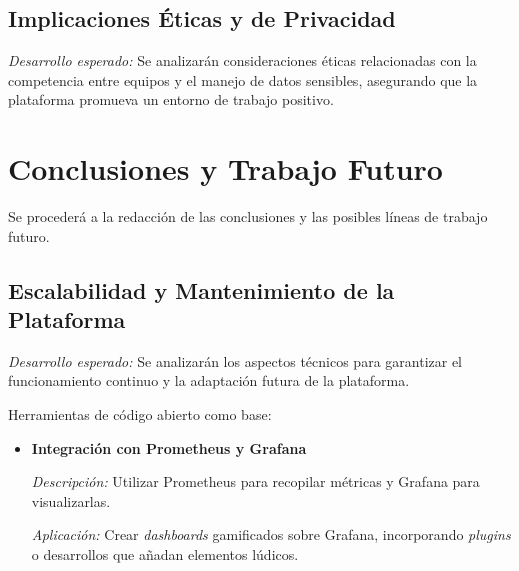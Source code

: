 \documentclass[journal]{IEEEtran}
\begin{document}
\subsection{\textbf{Implicaciones Éticas y de Privacidad}}

\textit{Desarrollo esperado:} Se analizarán consideraciones éticas relacionadas con la competencia entre equipos y el manejo de datos sensibles, asegurando que la plataforma promueva un entorno de trabajo positivo.

\section{\textbf{\Large Conclusiones y Trabajo Futuro}}
Se procederá a la redacción de las conclusiones y las posibles líneas de trabajo futuro.

\subsection{\textbf{Escalabilidad y Mantenimiento de la Plataforma}}

\textit{Desarrollo esperado:} Se analizarán los aspectos técnicos para garantizar el funcionamiento continuo y la adaptación futura de la plataforma.

Herramientas de código abierto como base:

\begin{itemize}
    \item \textbf{Integración con Prometheus y Grafana}
    
    \textit{Descripción:} Utilizar Prometheus para recopilar métricas y Grafana para visualizarlas.
    
    \textit{Aplicación:} Crear \textit{dashboards} gamificados sobre Grafana, incorporando \textit{plugins} o desarrollos que añadan elementos lúdicos.
\end{itemize}




\end{document}
